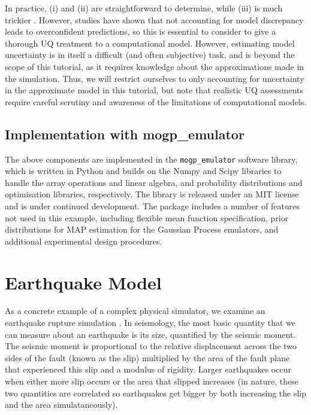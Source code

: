 \documentclass[openacc]{rstransa}%
\begin{document}
In practice, (i) and (ii) are straightforward to determine, while (iii) is much trickier \cite{modeldiscrep}. However, studies have shown that not accounting for model discrepancy leads to overconfident predictions, so this is essential to consider to give a thorough UQ treatment to a computational model. However, estimating model uncertainty is in itself a difficult (and often subjective) task, and is beyond the scope of this tutorial, as it requires knowledge about the approximations made in the simulation. Thus, we will restrict ourselves to only accounting for uncertainty in the approximate model in this tutorial, but note that realistic UQ assessments require careful scrutiny and awareness of the limitations of computational models.

\subsection{Implementation with mogp\_emulator}

The above components are implemented in the \texttt{mogp\_emulator} software library, which is
written in Python and builds on the Numpy and Scipy libraries \cite{scipy} to handle the array operations and
linear algebra, and probability distributions and optimisation libraries, respectively. The
library is released under an MIT license and is under continued development. The
package includes a number of features not used in this example, including flexible mean function
specification, prior distributions for MAP estimation for the Gaussian Process emulators, and additional
experimental design procedures.

\section{Earthquake Model}

As a concrete example of a complex physical simulator, we examine an earthquake rupture simulation
\cite{earthquakedynamics,daubcarlson}.
In seismology, the most basic quantity that we can measure about an earthquake is its size,
quantified by the seismic moment. The seismic moment is proportional to the relative displacement across the
two sides of the fault (known as the slip) multiplied by the area of the fault plane that experienced this slip
and a modulus of rigidity. Larger earthquakes occur when either more slip occurs or the area that slipped
increases (in nature, these two quantities are correlated so earthquakes get bigger by both increasing the slip
and the area simulataneously).
\end{document}
